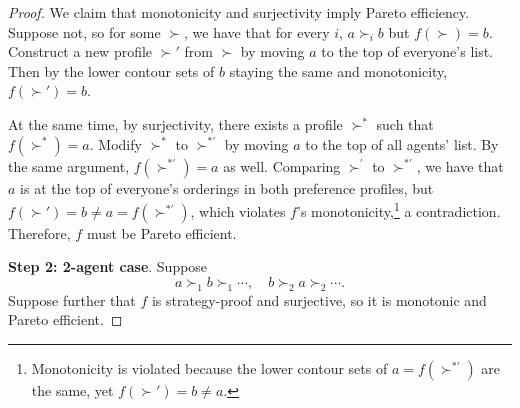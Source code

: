 \begin{proof}
	We claim that monotonicity and surjectivity imply Pareto efficiency.
	Suppose not, so for some $\succ$, we have that for every $i$, $a \succ_i b$ but $f(\succ) = b$. Construct a new profile $\succ'$ from $\succ $ by moving $a$ to the top of everyone's list. Then by the lower contour sets of $b$ staying the same and monotonicity, $f(\succ') = b$.

	At the same time, by surjectivity, there exists a profile $\succ^*$ such that $f(\succ^*) = a$.
	Modify $\succ^*$ to $\succ^{*'}$ by moving $a$ to the top of all agents' list. By the same argument, $f(\succ^{*'}) = a$ as well. Comparing $\succ^{'}$ to $\succ^{*'}$, we have that $a$ is at the top of everyone's orderings in both preference profiles, but $f(\succ') = b \ne a = f(\succ^{*'})$, which violates $f$'s monotonicity,\footnote{Monotonicity is violated because the lower contour sets of $a = f(\succ^{*'})$ are the same, yet $f(\succ') = b \ne a$.} a contradiction. Therefore, $f$ must be Pareto efficient.

	\textbf{Step 2: 2-agent case}.
	Suppose 
	\begin{equation} \label{3-25-1}
		a \succ_1 b \succ_1 \cdots, \quad b\succ_2 a \succ_2 \cdots.
	\end{equation} Suppose further that $f$ is strategy-proof and surjective, so it is monotonic and Pareto efficient.


\end{proof}
